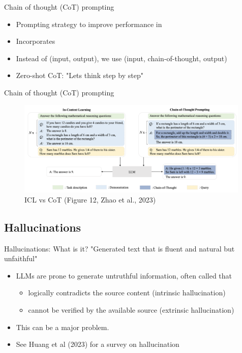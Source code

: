 \documentclass[10pt]{beamer}
\begin{document}
\begin{frame}{Chain of thought (CoT) prompting}


\begin{itemize}
\item Prompting strategy to improve performance in 
\pause
\item Incorporates 
\item Instead of (input, output), we use (input, chain-of-thought, output)
\pause
\item Zero-shot CoT: "Lets think step by step"
\end{itemize}

\end{frame}


\begin{frame}{Chain of thought (CoT) prompting}


\begin{figure}[h]
\centering
\includegraphics[width=0.99\textwidth]{fig/zhao_2023_fig12}
\caption{ICL vs CoT (Figure 12, Zhao et al., 2023)}
\end{figure}

\end{frame}


\subsection{Hallucinations}

\begin{frame}{Hallucinations: What is it?}
"Generated text that is fluent and natural but unfaithful"

\begin{itemize}
\item LLMs are prone to generate untruthful information, often called  that
\begin{itemize}
\item logically contradicts the source content (intrinsic hallucination)
\item cannot be verified by the available source (extrinsic hallucination)
\end{itemize}
\item This can be a major problem.
\item See Huang et al (2023) for a survey on hallucination %
\end{itemize}

\end{frame}
\end{document}
